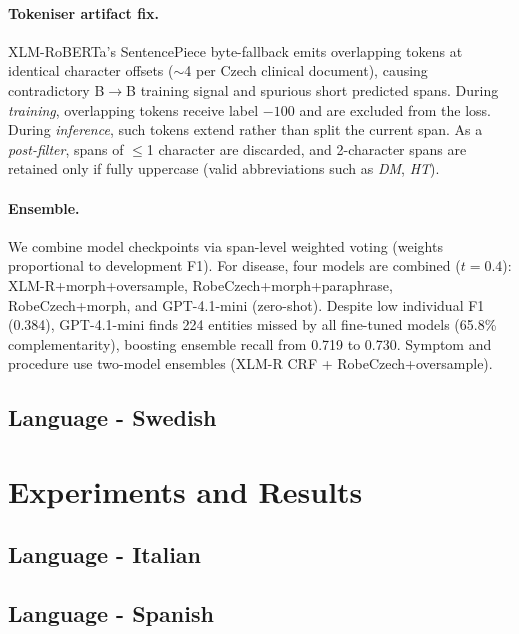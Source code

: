 \documentclass[11pt]{article}
\begin{document}
\paragraph{Tokeniser artifact fix.}
XLM-RoBERTa's SentencePiece byte-fallback emits overlapping tokens at identical character
offsets ($\sim$4 per Czech clinical document), causing contradictory B$\to$B training
signal and spurious short predicted spans.
During \textit{training}, overlapping tokens receive label $-100$ and are excluded from
the loss. During \textit{inference}, such tokens extend rather than split the current
span. As a \textit{post-filter}, spans of $\leq$1 character are discarded, and 2-character
spans are retained only if fully uppercase (valid abbreviations such as \textit{DM},
\textit{HT}).

\paragraph{Ensemble.}
We combine model checkpoints via span-level weighted voting (weights proportional to
development F1). For disease, four models are combined ($t{=}0.4$):
XLM-R+morph+oversample, RobeCzech+morph+paraphrase, RobeCzech+morph, and GPT-4.1-mini
(zero-shot). Despite low individual F1 (0.384), GPT-4.1-mini finds 224 entities missed
by all fine-tuned models (65.8\% complementarity), boosting ensemble recall from 0.719
to 0.730. Symptom and procedure use two-model ensembles
(XLM-R CRF + RobeCzech+oversample).


\subsection{Language - Swedish}

\section{Experiments and Results}
\subsection{Language - Italian}

\subsection{Language - Spanish}
\end{document}
